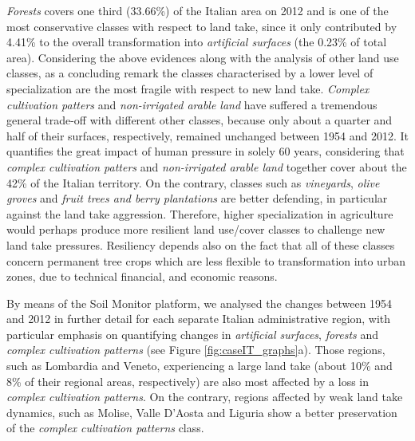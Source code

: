 \documentclass[APA,LATO1COL,doublespace]{WileyNJD-v2}
\begin{document}
\textit{Forests} covers one third (33.66\%) of the Italian area on 2012 and is one of the most conservative classes with respect to land take, since it only contributed by 4.41\% to the overall transformation into \textit{artificial surfaces} (the 0.23\% of total area).
Considering the above evidences along with the analysis of other land use classes, as a concluding remark the classes characterised by a lower level of specialization are the most fragile with respect to new land take.
\textit{Complex cultivation patters} and \textit{non-irrigated arable land} have suffered a tremendous general trade-off with different other classes, because only about a quarter and half of their surfaces, respectively, remained unchanged between 1954 and 2012.
It quantifies the great impact of human pressure in solely 60 years, considering that \textit{complex cultivation patters} and \textit{non-irrigated arable land} together cover about the 42\% of the Italian territory.
On the contrary, classes such as \textit{vineyards}, \textit{olive groves} and \textit{fruit trees and berry plantations} are better defending, in particular against the land take aggression.
Therefore, higher specialization in agriculture would perhaps produce more resilient land use/cover classes to challenge new land take pressures.
Resiliency depends also on the fact that all of these classes concern permanent tree crops which are less flexible to transformation into urban zones, due to technical financial, and economic reasons.

By means of the Soil Monitor platform, we analysed the changes between 1954 and 2012 in further detail
for each separate Italian administrative region, with particular emphasis on quantifying changes in \textit{artificial surfaces}, \textit{forests} and \textit{complex cultivation patterns} (see Figure \ref{fig:caseIT_graphs}a).
Those regions, such as Lombardia and Veneto, experiencing a large land take (about 10\% and 8\% of their regional areas, respectively) are also most affected by a loss in \textit{complex cultivation patterns}.
On the contrary, regions affected by weak land take dynamics, such as Molise, Valle D'Aosta and Liguria show a better preservation of the \textit{complex cultivation patterns} class.
\end{document}
